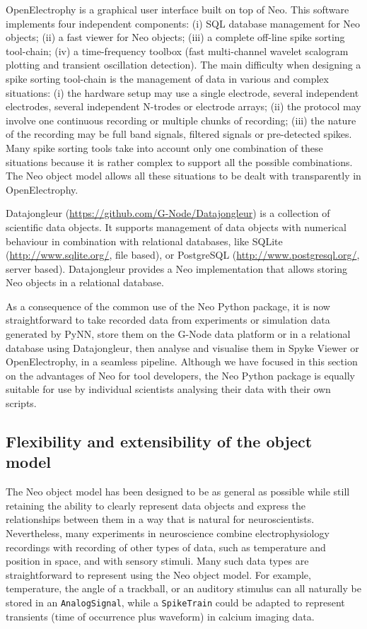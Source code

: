 \documentclass{frontiers}
\begin{document}
OpenElectrophy \citep{Garcia2009} is a graphical user interface built on top of Neo. This software implements four independent components:
   (i) SQL database management for Neo objects;
   (ii) a fast viewer for Neo objects;
   (iii) a complete off-line spike sorting tool-chain;
   (iv) a time-frequency toolbox (fast multi-channel wavelet scalogram plotting and transient oscillation detection).
The main difficulty when designing a spike sorting tool-chain is the management of data in various and complex situations: 
   (i) the hardware setup may use a single electrode, several independent electrodes, several independent N-trodes or electrode arrays;
   (ii) the protocol may involve one continuous recording or multiple chunks of recording;
   (iii) the nature of the recording may be full band signals, filtered signals or pre-detected spikes.
Many spike sorting tools take into account only one combination of these situations because it is rather complex to support all the possible combinations. The Neo object model allows all these situations to be dealt with transparently in OpenElectrophy.

Datajongleur (\url{https://github.com/G-Node/Datajongleur}) is a collection of
scientific data objects. It supports management of data objects with numerical
behaviour in combination with relational databases, like SQLite
(\url{http://www.sqlite.org/}, file based), or PostgreSQL
(\url{http://www.postgresql.org/}, server based). Datajongleur provides
a Neo implementation that allows storing Neo objects in a relational database.


As a consequence of the common use of the Neo Python package, it is now straightforward to take recorded data from experiments or simulation data generated by PyNN, store them on the G-Node data platform or in a relational database using Datajongleur, then analyse and visualise them in Spyke Viewer or OpenElectrophy, in a seamless pipeline.
Although we have focused in this section on the advantages of Neo for tool developers, the Neo Python package is equally suitable for use by individual scientists analysing their data with their own scripts.


\subsection{Flexibility and extensibility of the object model}

The Neo object model has been designed to be as general as possible while still retaining the ability to clearly represent data objects and express the relationships between them in a way that is natural for neuroscientists. Nevertheless, many experiments in neuroscience combine electrophysiology recordings with recording of other types of data, such as temperature and position in space, and with sensory stimuli. Many such data types are straightforward to represent using the Neo object model. For example, temperature, the angle of a trackball, or an auditory stimulus can all naturally be stored in an  \lstinline`AnalogSignal`, while a \lstinline`SpikeTrain` could be adapted to represent transients (time of occurrence plus waveform) in calcium imaging data.
\end{document}
